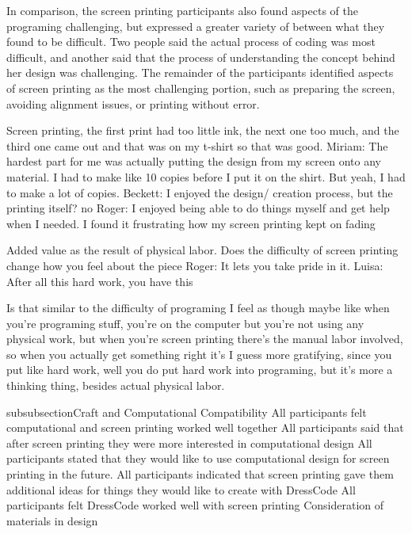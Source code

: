 \documentclass{sigchi}
\begin{document}
In comparison, the screen printing participants also found aspects of the programing challenging, but expressed a greater variety of between what they found to be difficult. Two people said the actual process of coding was most difficult, and another said that the process of understanding the concept behind her design was challenging. The remainder of the participants identified aspects of screen printing as the most challenging portion, such as preparing the screen, avoiding alignment issues, or printing without error.

Screen printing, the first print had too little ink, the next one too much, and the third one came out and that was on my t-shirt so that was good.
Miriam: The hardest part for me was actually putting the design from my screen onto any material. I had to make like 10 copies before I put it on the shirt. But yeah, I had to make a lot of copies. 
Beckett: I enjoyed the design/ creation process, but the printing itself? no
Roger: I enjoyed being able to do things myself and get help when I needed. I found it frustrating how my screen printing kept on fading

Added value as the result of physical labor.
Does the difficulty of screen printing change how you feel about the piece
Roger: It lets you take pride in it.
Luisa: After all this hard work, you have this	

Is that similar to the difficulty of programing
I feel as though maybe like when you're programing stuff, you're on the computer but you're not using any physical work, but when you're screen printing there's the manual labor involved, so when you actually get something right it's I guess more gratifying, since you put like hard work, well you do put hard work into programing, but it's more a thinking thing, besides actual physical labor.

subsubsection{Craft and Computational Compatibility}
All participants felt computational and screen printing worked well together
All participants said that after screen printing they were more interested in computational design
All participants stated that they would like to use computational design for screen printing in the future.
All participants indicated that screen printing gave them additional ideas for things they would like to create with DressCode
All participants felt DressCode worked well with screen printing
Consideration of materials in design
\end{document}
